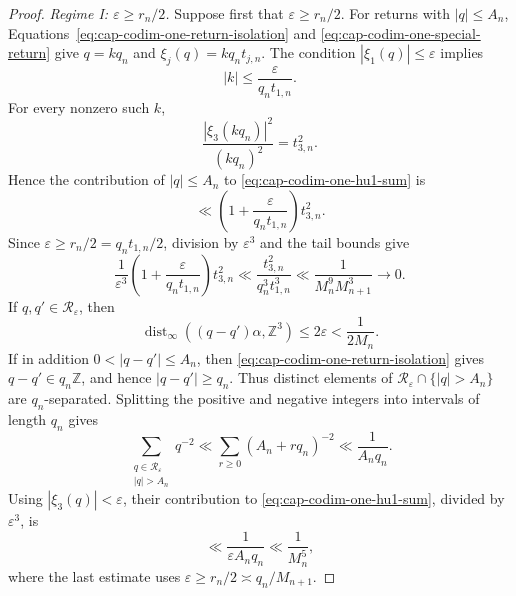 \documentclass[10pt,a4paper]{amsart}
\begin{document}
\begin{proof}
\smallskip\noindent\emph{Regime I: $\varepsilon\geq r_n/2$.}
Suppose first that $\varepsilon\geq r_n/2$.  For returns with $|q|\leq A_n$,
Equations~\eqref{eq:cap-codim-one-return-isolation} and
\eqref{eq:cap-codim-one-special-return} give $q=kq_n$ and
$\xi_j(q)=kq_nt_{j,n}$.  The condition $|\xi_1(q)|\leq\varepsilon$ implies
\[
  |k|\leq \frac{\varepsilon}{q_nt_{1,n}}.
\]
For every nonzero such $k$,
\[
  \frac{|\xi_3(kq_n)|^2}{(kq_n)^2}=t_{3,n}^2.
\]
Hence the contribution of $|q|\leq A_n$ to
\eqref{eq:cap-codim-one-hu1-sum} is
\begin{equation}\label{eq:cap-codim-one-small-return-contribution}
  \ll
  \left(1+\frac{\varepsilon}{q_nt_{1,n}}\right)t_{3,n}^2.
\end{equation}
Since $\varepsilon\geq r_n/2=q_nt_{1,n}/2$, division by $\varepsilon^3$
and the tail bounds give
\begin{equation}\label{eq:cap-codim-one-small-return-normalized}
  \frac{1}{\varepsilon^3}
  \left(1+\frac{\varepsilon}{q_nt_{1,n}}\right)t_{3,n}^2
  \ll
  \frac{t_{3,n}^2}{q_n^3t_{1,n}^3}
  \ll\frac1{M_n^9M_{n+1}^3}
  \longrightarrow0.
\end{equation}
If $q,q'\in\mathcal R_\varepsilon$, then
\[
  \operatorname{dist}_\infty((q-q')\alpha,\mathbb Z^3)
  \leq 2\varepsilon<\frac1{2M_n}.
\]
If in addition $0<|q-q'|\leq A_n$, then
\eqref{eq:cap-codim-one-return-isolation} gives
$q-q'\in q_n\mathbb Z$, and hence $|q-q'|\geq q_n$.  Thus distinct elements
of $\mathcal R_\varepsilon\cap\{|q|>A_n\}$ are $q_n$-separated.  Splitting the
positive and negative integers into intervals of length $q_n$ gives
\[
  \sum_{\substack{q\in\mathcal R_\varepsilon\\|q|>A_n}}q^{-2}
  \ll \sum_{r\geq0}(A_n+rq_n)^{-2}
  \ll\frac1{A_nq_n}.
\]
Using $|\xi_3(q)|<\varepsilon$, their contribution to
\eqref{eq:cap-codim-one-hu1-sum}, divided by $\varepsilon^3$, is
\begin{equation}\label{eq:cap-codim-one-large-return-normalized}
  \ll\frac1{\varepsilon A_nq_n}
  \ll\frac1{M_n^5},
\end{equation}
where the last estimate uses
$\varepsilon\geq r_n/2\asymp q_n/M_{n+1}$.


\end{proof}
\end{document}
